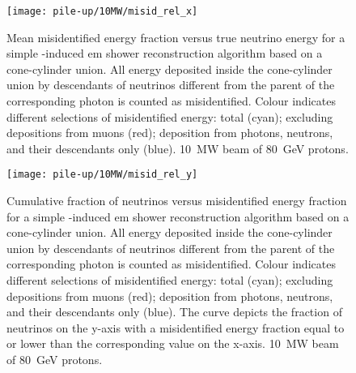 \begin{figure}[htb]
	\centering
	\texttt{[image: pile-up/10MW/misid\_rel\_x]}
	\caption[Pile-up study mean misidentified fractional vs.\ true neutrino energy, \SI{10}{\mega\watt} beam]{%
		Mean misidentified energy fraction versus true neutrino energy for a simple \Pgpz-induced \acrshort{em} shower reconstruction algorithm based on a cone-cylinder union.
		All energy deposited inside the cone-cylinder union by descendants of neutrinos different from the parent of the corresponding \Pgpz photon is counted as misidentified.
		Colour indicates different selections of misidentified energy: total (cyan); excluding depositions from muons (red); deposition from photons, neutrons, and their descendants only (blue).
		\SI{10}{\mega\watt} beam of \SI{80}{\giga\electronvolt} protons.
	}
	\label{fig:dune-nd_10MW_misid-rel-x}
\end{figure}

\begin{figure}[htb]
	\centering
	\texttt{[image: pile-up/10MW/misid\_rel\_y]}
	\caption[Pile-up study neutrino vs.\ misidentified energy fraction, \SI{10}{\mega\watt} beam]{%
		Cumulative fraction of neutrinos versus misidentified energy fraction for a simple \Pgpz-induced \acrshort{em} shower reconstruction algorithm based on a cone-cylinder union.
		All energy deposited inside the cone-cylinder union by descendants of neutrinos different from the parent of the corresponding \Pgpz photon is counted as misidentified.
		Colour indicates different selections of misidentified energy: total (cyan); excluding depositions from muons (red); deposition from photons, neutrons, and their descendants only (blue).
		The curve depicts the fraction of neutrinos on the y-axis with a misidentified energy fraction equal to or lower than the corresponding value on the x-axis.
		\SI{10}{\mega\watt} beam of \SI{80}{\giga\electronvolt} protons.
	}
	\label{fig:dune-nd_10MW_misid-rel-y}
\end{figure}

